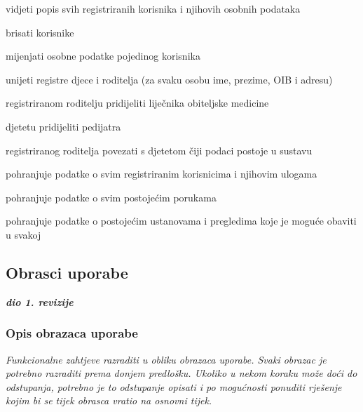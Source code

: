 \begin{packed_enum}
\begin{packed_enum}
					\item vidjeti popis svih registriranih korisnika i njihovih osobnih podataka
					\item brisati korisnike
					\item mijenjati osobne podatke pojedinog korisnika
					\item unijeti registre djece i roditelja (za svaku osobu ime, prezime, OIB i adresu)
					\item registriranom roditelju pridijeliti liječnika obiteljske medicine
					\item djetetu pridijeliti pedijatra
					\item registriranog roditelja povezati s djetetom čiji podaci postoje u sustavu
					
				\end{packed_enum}
				
				\item  {}
				
				\begin{packed_enum}
					
					\item pohranjuje podatke o svim registriranim korisnicima i njihovim ulogama
					\item pohranjuje podatke o svim postojećim porukama
					\item pohranjuje podatke o postojećim ustanovama i pregledima koje je moguće obaviti u svakoj
					
				\end{packed_enum}
				
				
			\end{packed_enum}
			
			\eject 
			
			
				
			\subsection{Obrasci uporabe}
				
				\textbf{\textit{dio 1. revizije}}
				
				\subsubsection{Opis obrazaca uporabe}
					\textit{Funkcionalne zahtjeve razraditi u obliku obrazaca uporabe. Svaki obrazac je potrebno razraditi prema donjem predlošku. Ukoliko u nekom koraku može doći do odstupanja, potrebno je to odstupanje opisati i po mogućnosti ponuditi rješenje kojim bi se tijek obrasca vratio na osnovni tijek.}\\
					

